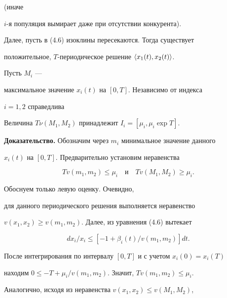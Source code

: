 (иначе 


$i$-я популяция вымирает даже при отсутствии конкурента). 


 


Далее, пусть в (4.6) изоклины пересекаются. Тогда существует 


положительное, $T$-пе\-ри\-о\-ди\-чес\-кое решение $\langle x_1(t),x_2(t)\rangle$.


Пусть $M_i$ --- 


максимальное значение $x_i(t)$ на $[0,T]$. Независимо от индекса 


$i=1,2$ справедлива 


 


\begin{lem} 


Величина $T\nu(M_1,M_2)$ принадлежит $I_i=[\mu_i,\mu_i\exp T]$. 


\end{lem} 


 


{\bf Доказательство.} Обозначим через $m_i$ минимальное значение данного 


$x_i(t)$ на $[0,T]$. Предварительно установим неравенства 


\begin{equation} 


T v(m_1,m_2)\le\mu_i 


\quad\text{и}\quad 


T v(M_1,M_2)\ge\mu_i. 


\end{equation} 


Обоснуем только левую оценку. Очевидно, 


для данного периодического решения выполняется неравенство 


$v(x_1,x_2)\ge v(m_1,m_2)$. Далее, из уравнения (4.6) вытекает 


$$ 


d x_i/x_i\le[-1+\beta_i(t)/v(m_1,m_2)]d t. 


$$ 


После интегрирования по интервалу $[0,T]$ и с учетом $x_i(0)=x_i(T)$ 


находим $0\le-T+\mu_i /v(m_1,m_2)$. Значит, $T v(m_1,m_2)\le \mu_i$. 


 


Аналогично, исходя из неравенства $v(x_1,x_2)\le v(M_1,M_2)$, 


